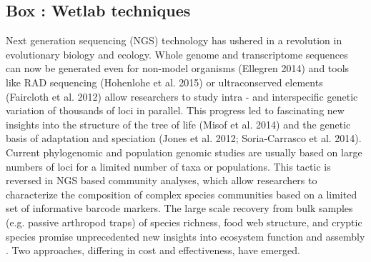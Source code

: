 \documentclass[12pt]{article}
\newcounter{Box}
\begin{document}
\subsection*{Box \theBox: Wetlab techniques}
Next generation sequencing (NGS) technology has ushered in a revolution in evolutionary biology and ecology.  Whole genome and transcriptome sequences can now be generated even for non-model organisms (Ellegren 2014) and tools like RAD sequencing (Hohenlohe et al. 2015) or ultraconserved elements (Faircloth et al. 2012) allow researchers to study intra - and interspecific genetic variation of thousands of loci in parallel. This progress led to fascinating new insights into the structure of the tree of life (Misof et al. 2014) and the genetic basis of adaptation and speciation (Jones et al. 2012; Soria-Carrasco et al. 2014). 
% 
% 
% 
% 
% 
Current phylogenomic and population genomic studies are usually based on large numbers of loci for a limited number of taxa or populations. This tactic is reversed in NGS based community analyses, which allow researchers to characterize the composition of complex species communities based on a limited set of informative barcode markers. The large scale recovery from bulk
samples (e.g. passive arthropod traps) of species richness, food web
structure, and cryptic species promise unprecedented new insights into
ecosystem function and assembly \citep{krehenwinkel2016,
  shokralla2015, gibson2014, taberlet2012}.  Two approaches, differing
in cost and effectiveness, have emerged.
\end{document}
